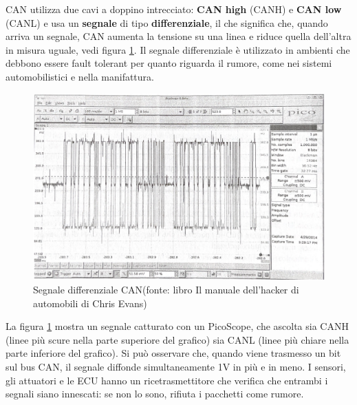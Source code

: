 \documentclass[12pt, a4paper, italian]{report}
\numberwithin{figure}{chapter}
\numberwithin{table}{chapter}
\begin{document}
\newpage

CAN utilizza due cavi a doppino intrecciato: \textbf{CAN high} (CANH) e \textbf{CAN low} (CANL) e usa un \textbf{segnale} di tipo \textbf{differenziale}, il che significa che, quando arriva un segnale, CAN aumenta la tensione su una linea e riduce quella dell'altra in misura uguale, vedi figura \ref{fig:segnaleDiffCAN}. Il segnale differenziale è utilizzato in ambienti che debbono essere fault tolerant per quanto riguarda il rumore, come nei sistemi automobilistici e nella manifattura.

\vspace{0.2cm}

\begin{figure}[h]
  \centering
  \includegraphics[width=15cm]{SegnaleDiffCAN.png}
  \caption{Segnale differenziale CAN\protect\footnotemark (fonte: libro Il manuale dell'hacker di automobili di Chris Evans)}
  \label{fig:segnaleDiffCAN}
\end{figure}

La figura \ref{fig:segnaleDiffCAN} mostra un segnale catturato con un PicoScope, che ascolta sia CANH (linee più scure nella parte superiore del grafico) sia CANL (linee più chiare nella parte inferiore del grafico). Si può osservare che, quando viene trasmesso un bit sul bus CAN, il segnale diffonde simultaneamente 1V in più e in meno. I sensori, gli attuatori e le ECU hanno un ricetrasmettitore che verifica che entrambi i segnali siano innescati: se non lo sono, rifiuta i pacchetti come rumore. 
\end{document}
